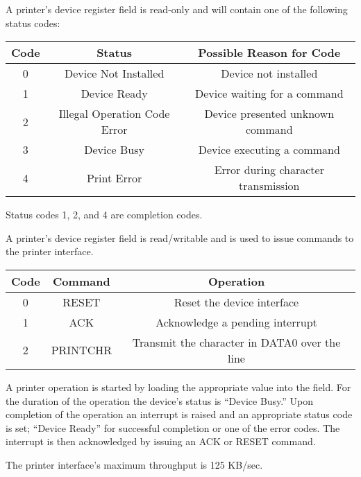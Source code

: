 
A printer’s device register  field is read-only and will contain one of the following status codes:

\begin{center}
	\begin{tabular}{|c|c|c|}
		\hline
		Code & Status & Possible Reason for Code\\
		\hline
		\hline
		0 & Device Not Installed & Device not installed\\
		\hline
		1 & Device Ready & Device waiting for a command\\
		\hline
		2 & Illegal Operation Code Error & Device presented unknown command\\
		\hline
		3 & Device Busy & Device executing a command\\
		\hline
		4 & Print Error & Error during character transmission\\
		\hline
	\end{tabular}
\end{center}

Status codes 1, 2, and 4 are completion codes.

A printer’s device register  field is read/writable and is used to issue commands to the printer interface.

\begin{center}
	\begin{tabular}{|c|c|c|}
		\hline
		Code & Command & Operation\\
		\hline
		\hline
		0 & RESET & Reset the device interface\\
		\hline
		1 & ACK & Acknowledge a pending interrupt\\
		\hline
		2 & PRINTCHR & Transmit the character in DATA0 over the line\\
		\hline
	\end{tabular}
\end{center}

A printer operation is started by loading the appropriate value into the  field. 
For the duration of the operation the device’s status is “Device Busy.” 
Upon completion of the operation an interrupt is raised and an appropriate status code is set; “Device Ready” for successful completion or one of the error codes. 
The interrupt is then acknowledged by issuing an ACK or RESET command.

The printer interface’s maximum throughput is 125 KB/sec.


